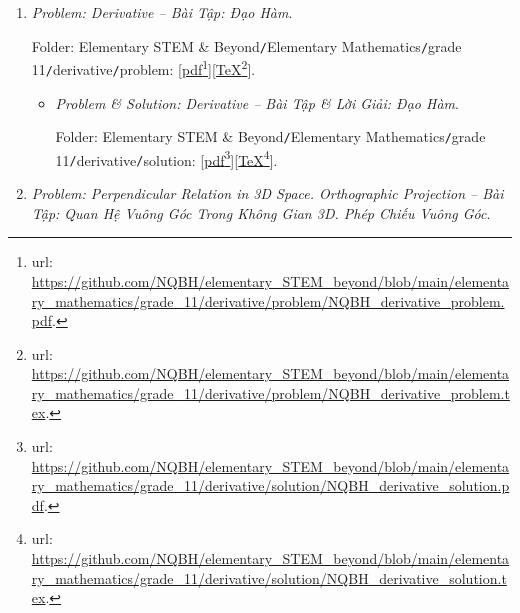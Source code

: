 \documentclass[12pt]{article}
\begin{document}
\begin{enumerate}
\begin{itemize}
		Folder: {\sf Elementary STEM \& Beyond{\tt/}Elementary Mathematics{\tt/}grade 11{\tt/}exp log {\tt/}solution}: [\href{https://github.com/NQBH/elementary_STEM_beyond/blob/main/elementary_mathematics/grade_11/exponentiation_logarithm/solution/NQBH_exponentiation_logarithm_solution.pdf}{pdf}\footnote{{\sc url}: \url{https://github.com/NQBH/elementary_STEM_beyond/blob/main/elementary_mathematics/grade_11/exponentiation_logarithm/solution/NQBH_exponentiation_logarithm_solution.pdf}.}][\href{https://github.com/NQBH/elementary_STEM_beyond/blob/main/elementary_mathematics/grade_11/exponentiation_logarithm/solution/NQBH_exponentiation_logarithm_solution.tex}{\TeX}\footnote{{\sc url}: \url{https://github.com/NQBH/elementary_STEM_beyond/blob/main/elementary_mathematics/grade_11/exponentiation_logarithm/solution/NQBH_exponentiation_logarithm_solution.tex}.}].
	\end{itemize}
	\item {\it Problem: Derivative -- Bài Tập: Đạo Hàm}.
	
	Folder: {\sf Elementary STEM \& Beyond{\tt/}Elementary Mathematics{\tt/}grade 11{\tt/}derivative{\tt/}problem}: [\href{https://github.com/NQBH/elementary_STEM_beyond/blob/main/elementary_mathematics/grade_11/derivative/problem/NQBH_derivative_problem.pdf}{pdf}\footnote{{\sc url}: \url{https://github.com/NQBH/elementary_STEM_beyond/blob/main/elementary_mathematics/grade_11/derivative/problem/NQBH_derivative_problem.pdf}.}][\href{https://github.com/NQBH/elementary_STEM_beyond/blob/main/elementary_mathematics/grade_11/derivative/problem/NQBH_derivative_problem.tex}{\TeX}\footnote{{\sc url}: \url{https://github.com/NQBH/elementary_STEM_beyond/blob/main/elementary_mathematics/grade_11/derivative/problem/NQBH_derivative_problem.tex}.}].
	\begin{itemize}
		\item {\it Problem \& Solution: Derivative -- Bài Tập \& Lời Giải: Đạo Hàm}.
		
		Folder: {\sf Elementary STEM \& Beyond{\tt/}Elementary Mathematics{\tt/}grade 11{\tt/}derivative{\tt/}solution}: [\href{https://github.com/NQBH/elementary_STEM_beyond/blob/main/elementary_mathematics/grade_11/derivative/solution/NQBH_derivative_solution.pdf}{pdf}\footnote{{\sc url}: \url{https://github.com/NQBH/elementary_STEM_beyond/blob/main/elementary_mathematics/grade_11/derivative/solution/NQBH_derivative_solution.pdf}.}][\href{https://github.com/NQBH/elementary_STEM_beyond/blob/main/elementary_mathematics/grade_11/derivative/solution/NQBH_derivative_solution.tex}{\TeX}\footnote{{\sc url}: \url{https://github.com/NQBH/elementary_STEM_beyond/blob/main/elementary_mathematics/grade_11/derivative/solution/NQBH_derivative_solution.tex}.}].
	\end{itemize}
	\item {\it Problem: Perpendicular Relation in 3D Space. Orthographic Projection -- Bài Tập: Quan Hệ Vuông Góc Trong Không Gian 3D. Phép Chiếu Vuông Góc}.
	

\end{enumerate}
\end{document}
